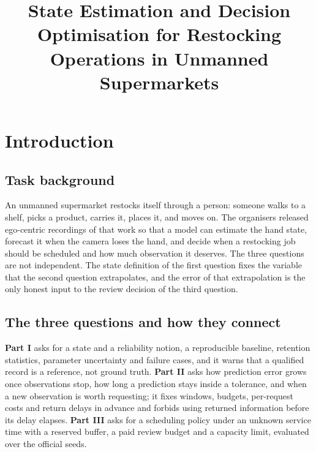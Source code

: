 \documentclass{swmcmthesis}
\title{State Estimation and Decision Optimisation for Restocking Operations in Unmanned Supermarkets}
\date{\slotYear}
\begin{document}
\makeatletter
\g@addto@macro\@maketitle{\thispagestyle{fancy}}
\makeatother

\maketitle
{}

\setcounter{tocdepth}{\slotTocDepth}
\tableofcontents
\thispagestyle{fancy}
\newpage

\section{Introduction}

\subsection{Task background}

An unmanned supermarket restocks itself through a person: someone walks to a
shelf, picks a product, carries it, places it, and moves on. The organisers
released ego-centric recordings of that work so that a model can estimate the
hand state, forecast it when the camera loses the hand, and decide when a
restocking job should be scheduled and how much observation it deserves.
The three questions are not independent. The state definition of the first
question fixes the variable that the second question extrapolates, and the error
of that extrapolation is the only honest input to the review decision of the third
question.

\subsection{The three questions and how they connect}

\textbf{Part I} asks for a state and a reliability notion, a reproducible
baseline, retention statistics, parameter uncertainty and failure cases, and it
warns that a qualified record is a reference, not ground truth. \textbf{Part II}
asks how prediction error grows once observations stop, how long a prediction
stays inside a tolerance, and when a new observation is worth requesting; it
fixes windows, budgets, per-request costs and return delays in advance and forbids
using returned information before its delay elapses. \textbf{Part III} asks for a
scheduling policy under an unknown service time with a reserved buffer, a paid
review budget and a capacity limit, evaluated over the official seeds.
\end{document}
